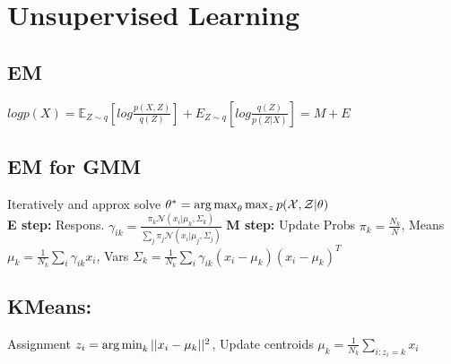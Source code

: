 \section*{Unsupervised Learning}
\subsection*{EM}
$log p(X)=\mathbb E_{Z\sim q}[log\frac{p(X,Z)}{q(Z)}]+E_{Z\sim q}[log\frac{q(Z)}{p(Z|X)}] = M+E$
\subsection*{EM for GMM}
Iteratively and approx solve $\theta^*=\operatorname*{arg\,max}_\theta \max_z p(\mathcal X, \mathcal Z|\theta)$\\
\textbf{E step:} Respons. $\gamma_{ik}=\frac{\pi_k\mathcal N(x_i|\mu_k,\Sigma_k)}{\sum_j\pi_j\mathcal N(x_i|\mu_j,\Sigma_j)}$
\textbf{M step:} Update Probs $\pi_k=\frac{N_k}{N}$, Means $\mu_k=\frac{1}{N_k}\sum_i\gamma_{ik}x_i$, Vars $\Sigma_k=\frac{1}{N_k}\sum_i\gamma_{ik}(x_i-\mu_k)(x_i-\mu_k)^T$\\
\subsection*{KMeans:} Assignment $z_i=\operatorname*{arg\,min}_k ||x_i-\mu_k||^2$, Update centroids $\mu_k=\frac{1}{N_k}\sum_{i:z_i=k} x_i$